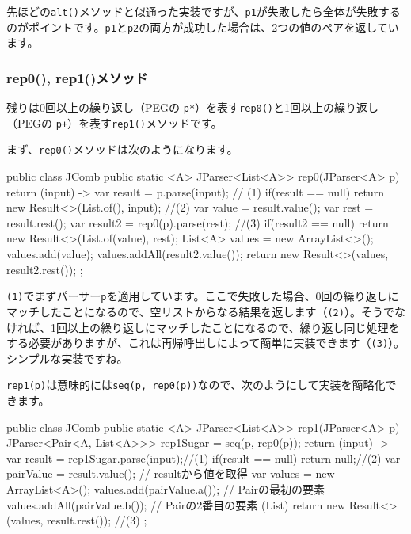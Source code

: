 先ほどの\texttt{alt()}メソッドと似通った実装ですが、\texttt{p1}が失敗したら全体が失敗するのがポイントです。\texttt{p1}と\texttt{p2}の両方が成功した場合は、2つの値のペアを返しています。

\subsubsection{rep0(), rep1()メソッド}

残りは0回以上の繰り返し（PEGの
\texttt{p*}）を表す\texttt{rep0()}と1回以上の繰り返し（PEGの
\texttt{p+}）を表す\texttt{rep1()}メソッドです。

まず、\texttt{rep0()}メソッドは次のようになります。

\begin{codescreen}{}
public class JComb {
    public static <A> JParser<List<A>> rep0(JParser<A> p) {
        return (input) -> {
            var result = p.parse(input); // (1)
            if(result == null) return new Result<>(List.of(), input); //(2)
            var value = result.value();
            var rest = result.rest();
            var result2 = rep0(p).parse(rest); //(3)
            if(result2 == null) return new Result<>(List.of(value), rest);
            List<A> values = new ArrayList<>();
            values.add(value);
            values.addAll(result2.value());
            return new Result<>(values, result2.rest());
        };
    }
}
\end{codescreen}

\texttt{(1)}でまずパーサー\texttt{p}を適用しています。ここで失敗した場合、0回の繰り返しにマッチしたことになるので、空リストからなる結果を返します（\texttt{(2)}）。そうでなければ、1回以上の繰り返しにマッチしたことになるので、繰り返し同じ処理をする必要がありますが、これは再帰呼出しによって簡単に実装できます（\texttt{(3)}）。シンプルな実装ですね。

\texttt{rep1(p)}は意味的には\texttt{seq(p,\ rep0(p))}なので、次のようにして実装を簡略化できます。

\begin{codescreen}{}
public class JComb {
    public static <A> JParser<List<A>> rep1(JParser<A> p) {
        JParser<Pair<A, List<A>>> rep1Sugar = seq(p, rep0(p));
        return (input) -> {
            var result = rep1Sugar.parse(input);//(1)
            if(result == null) return null;//(2)
            var pairValue = result.value(); // resultから値を取得
            var values = new ArrayList<A>();
            values.add(pairValue.a()); // Pairの最初の要素
            values.addAll(pairValue.b()); // Pairの2番目の要素 (List)
            return new Result<>(values, result.rest()); //(3)
        };
    }
}
\end{codescreen}

